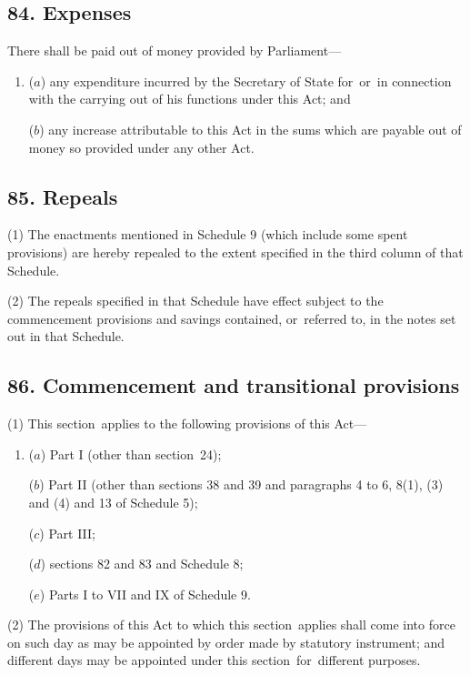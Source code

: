 \documentclass[12pt,a4paper]{article}
\begin{document}
\subsection{84. Expenses}

There shall be paid out of money provided by Parliament—
\begin{enumerate}\item[]
($a$) any expenditure incurred by the Secretary of State for~or~in connection with the carrying out of his functions under this Act; and

($b$) any increase attributable to this Act in the sums which are payable out of money so provided under any other Act.
\end{enumerate}

\subsection{85. Repeals}

(1) The enactments mentioned in Schedule 9 (which include some spent provisions) are hereby repealed to the extent specified in the third column of that Schedule.

(2) The repeals specified in that Schedule have effect subject to the commencement provisions and savings contained, or~referred to, in the notes set out in that Schedule.

\subsection{86. Commencement and transitional provisions}

(1) This section~applies to the following provisions of this Act—
\begin{enumerate}\item[]
($a$) Part I (other than section~24);

($b$) Part II (other than sections 38 and 39 and paragraphs 4 to 6, 8(1), (3)  and (4)  and 13 of Schedule 5);

($c$) Part III;

($d$) sections 82 and 83 and Schedule 8;

($e$) Parts I to VII and IX of Schedule 9. 
\end{enumerate}

(2) The provisions of this Act to which this section~applies shall come into force on such day as may be appointed by order made by statutory instrument; and different days may be appointed under this section~for~different purposes.
\end{document}
